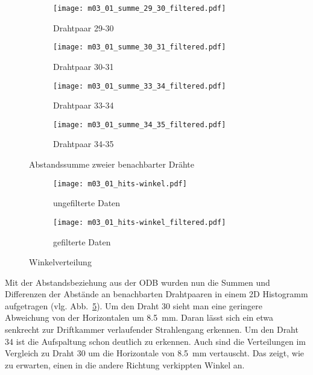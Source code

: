 \documentclass[11pt, ngerman, fleqn, DIV=15, headinclude, BCOR=2cm]{scrreprt}
\begin{document}
\begin{figure}
	\centering
	\begin{subfigure}{0.49 \linewidth}
		\texttt{[image: m03\_01\_summe\_29\_30\_filtered.pdf]}
		\caption{%
			Drahtpaar 29-30
		}
		\label{fig:m03_summe_29_30}
	\end{subfigure}
	\begin{subfigure}{0.49 \linewidth}
		\texttt{[image: m03\_01\_summe\_30\_31\_filtered.pdf]}
		\caption{%
			Drahtpaar 30-31
		}
		\label{fig:m03_summe_30_31}
	\end{subfigure}
	\begin{subfigure}{0.49 \linewidth}
		\texttt{[image: m03\_01\_summe\_33\_34\_filtered.pdf]}
		\caption{%
			Drahtpaar 33-34
		}
		\label{fig:m03_summe_33_34}
	\end{subfigure}
	\begin{subfigure}{0.49 \linewidth}
		\texttt{[image: m03\_01\_summe\_34\_35\_filtered.pdf]}
		\caption{%
			Drahtpaar 34-35
		}
		\label{fig:m03_summe_34_35}
	\end{subfigure}
\caption{%
		Abstandssumme zweier benachbarter Drähte
	}
	\label{fig:m03_ort_driftzeit}
\end{figure}

\begin{figure}
	\centering
	\begin{subfigure}{0.49 \linewidth}
		\texttt{[image: m03\_01\_hits-winkel.pdf]}
		\caption{%
			ungefilterte Daten
		}
		\label{fig:m03_hits-winkel}
	\end{subfigure}
	\begin{subfigure}{0.49 \linewidth}
		\texttt{[image: m03\_01\_hits-winkel\_filtered.pdf]}
		\caption{%
			gefilterte Daten
		}
		\label{fig:m03_hits-winkel_filtered}
	\end{subfigure}
	\caption{%
		Winkelverteilung
	}
	\label{fig:m03_winkelverteilung}
\end{figure}


Mit der Abstandsbeziehung aus der ODB wurden nun die Summen und Differenzen der
Abstände an benachbarten Drahtpaaren in einem 2D Histogramm aufgetragen (vlg.
Abb.~\ref{fig:m03_ort_driftzeit}).
Um den Draht 30 sieht man eine geringere Abweichung von der Horizontalen um
\SI{8.5}{\milli\metre}. Daran lässt sich ein etwa senkrecht zur Driftkammer
verlaufender Strahlengang erkennen. Um den Draht 34 ist die Aufspaltung schon
deutlich zu erkennen. Auch sind die Verteilungen im Vergleich zu Draht 30 um
die Horizontale von \SI{8.5}{\milli\metre} vertauscht. Das zeigt, wie zu
erwarten, einen in die andere Richtung verkippten Winkel an.
\end{document}
